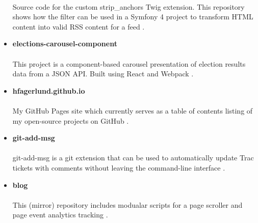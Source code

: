 \documentclass[11pt]{article}
\begin{document}
\begin{itemize}
   \paragraph{}
   Source code for the custom strip\_anchors Twig extension. This repository shows how the filter can be used in a Symfony 4 project to transform HTML content into valid RSS content for a feed \cite{stripanchors}.
\item \textbf{elections-carousel-component}
   \paragraph{}
   This project is a component-based carousel presentation of election results data from a JSON API. Built using React and Webpack \cite{elections-carousel-component}.
\item \textbf{hfagerlund.github.io}
   \paragraph{}
   My GitHub Pages site which currently serves as a table of contents listing of my open-source projects on GitHub \cite{ghpages}.
\item \textbf{git-add-msg}
   \paragraph{}
   git-add-msg is a git extension that can be used to automatically update Trac tickets with comments without leaving the command-line interface \cite{git-add-msg}.
\item \textbf{blog}
   \paragraph{}
   This (mirror) repository includes modualar scripts for a page scroller and page event analytics tracking \cite{blog}.
\end{itemize}

\begin{sloppypar}


\end{sloppypar}
\end{document}
